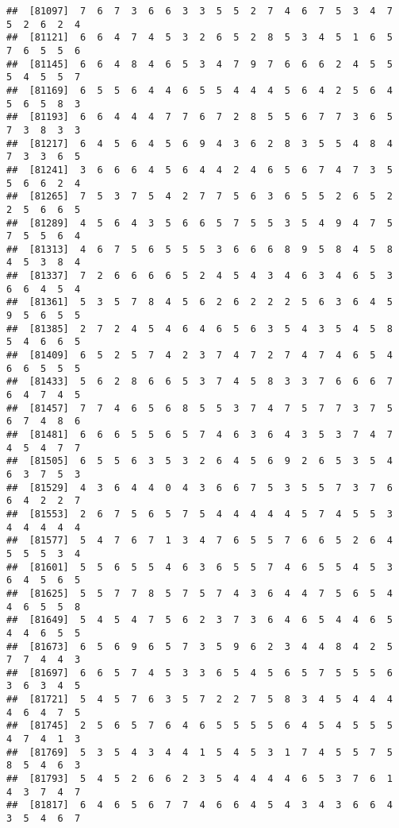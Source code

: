 \documentclass[
]{book}
\begin{document}
\begin{verbatim}
##  [81097]  7  6  7  3  6  6  3  3  5  5  2  7  4  6  7  5  3  4  7  5  2  6  2  4
##  [81121]  6  6  4  7  4  5  3  2  6  5  2  8  5  3  4  5  1  6  5  7  6  5  5  6
##  [81145]  6  6  4  8  4  6  5  3  4  7  9  7  6  6  6  2  4  5  5  5  4  5  5  7
##  [81169]  6  5  5  6  4  4  6  5  5  4  4  4  5  6  4  2  5  6  4  5  6  5  8  3
##  [81193]  6  6  4  4  4  7  7  6  7  2  8  5  5  6  7  7  3  6  5  7  3  8  3  3
##  [81217]  6  4  5  6  4  5  6  9  4  3  6  2  8  3  5  5  4  8  4  7  3  3  6  5
##  [81241]  3  6  6  6  4  5  6  4  4  2  4  6  5  6  7  4  7  3  5  5  6  6  2  4
##  [81265]  7  5  3  7  5  4  2  7  7  5  6  3  6  5  5  2  6  5  2  2  5  6  6  5
##  [81289]  4  5  6  4  3  5  6  6  5  7  5  5  3  5  4  9  4  7  5  7  5  5  6  4
##  [81313]  4  6  7  5  6  5  5  5  3  6  6  6  8  9  5  8  4  5  8  4  5  3  8  4
##  [81337]  7  2  6  6  6  6  5  2  4  5  4  3  4  6  3  4  6  5  3  6  6  4  5  4
##  [81361]  5  3  5  7  8  4  5  6  2  6  2  2  2  5  6  3  6  4  5  9  5  6  5  5
##  [81385]  2  7  2  4  5  4  6  4  6  5  6  3  5  4  3  5  4  5  8  5  4  6  6  5
##  [81409]  6  5  2  5  7  4  2  3  7  4  7  2  7  4  7  4  6  5  4  6  6  5  5  5
##  [81433]  5  6  2  8  6  6  5  3  7  4  5  8  3  3  7  6  6  6  7  6  4  7  4  5
##  [81457]  7  7  4  6  5  6  8  5  5  3  7  4  7  5  7  7  3  7  5  6  7  4  8  6
##  [81481]  6  6  6  5  5  6  5  7  4  6  3  6  4  3  5  3  7  4  7  4  5  4  7  7
##  [81505]  6  5  5  6  3  5  3  2  6  4  5  6  9  2  6  5  3  5  4  6  3  7  5  3
##  [81529]  4  3  6  4  4  0  4  3  6  6  7  5  3  5  5  7  3  7  6  6  4  2  2  7
##  [81553]  2  6  7  5  6  5  7  5  4  4  4  4  4  5  7  4  5  5  3  4  4  4  4  4
##  [81577]  5  4  7  6  7  1  3  4  7  6  5  5  7  6  6  5  2  6  4  5  5  5  3  4
##  [81601]  5  5  6  5  5  4  6  3  6  5  5  7  4  6  5  5  4  5  3  6  4  5  6  5
##  [81625]  5  5  7  7  8  5  7  5  7  4  3  6  4  4  7  5  6  5  4  4  6  5  5  8
##  [81649]  5  4  5  4  7  5  6  2  3  7  3  6  4  6  5  4  4  6  5  4  4  6  5  5
##  [81673]  6  5  6  9  6  5  7  3  5  9  6  2  3  4  4  8  4  2  5  7  7  4  4  3
##  [81697]  6  6  5  7  4  5  3  3  6  5  4  5  6  5  7  5  5  5  6  3  6  3  4  5
##  [81721]  5  4  5  7  6  3  5  7  2  2  7  5  8  3  4  5  4  4  4  4  6  4  7  5
##  [81745]  2  5  6  5  7  6  4  6  5  5  5  5  6  4  5  4  5  5  5  4  7  4  1  3
##  [81769]  5  3  5  4  3  4  4  1  5  4  5  3  1  7  4  5  5  7  5  8  5  4  6  3
##  [81793]  5  4  5  2  6  6  2  3  5  4  4  4  4  6  5  3  7  6  1  4  3  7  4  7
##  [81817]  6  4  6  5  6  7  7  4  6  6  4  5  4  3  4  3  6  6  4  3  5  4  6  7

\end{verbatim}
\end{document}
